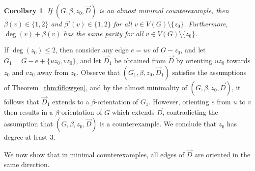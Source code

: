 \documentclass[12pt,twoside,openright,a4paper]{book}
\newtheorem{corollary}[theorem]{Corollary}
\begin{document}
\begin{corollary}\label{cor:nobound}
If $(G,\beta,z_0,\vec{D})$ is an almost minimal counterexample, then $\beta(v)\in\{1,2\}$ and $\beta'(v)\in \{1,2\}$ for all $v\in V(G)\setminus \{z_0\}$.
Furthermore, $\deg(v)+\beta(v)$ has the same parity for all $v\in V(G)\setminus \{z_0\}$.
\end{corollary}

If $\deg(z_0)\le 2$, then consider any edge $e=uv$ of $G-z_0$, and let $G_1=G-e+\{uz_0,vz_0\}$, and let $\vec{D}_1$ be obtained from $\vec{D}$
by orienting $uz_0$ towards $z_0$ and $vz_0$ away from $z_0$.  Observe that $(G_1,\beta,z_0,\vec{D}_1)$ satisfies the assumptions of
Theorem~\ref{thm:6flowgen}, and by the almost minimality of $(G,\beta,z_0,\vec{D})$, it follows that $\vec{D}_1$ extends to a $\beta$-orientation of $G_1$.
However, orienting $e$ from $u$ to $v$ then results in a $\beta$-orientation of $G$ which extends $\vec{D}$, contradicting the assumption that $(G,\beta,z_0,\vec{D})$ is
a counterexample.  We conclude that $z_0$ has degree at least $3$.

We now show that in minimal counterexamples, all edges of $\vec{D}$ are oriented in the same direction.
\end{document}
